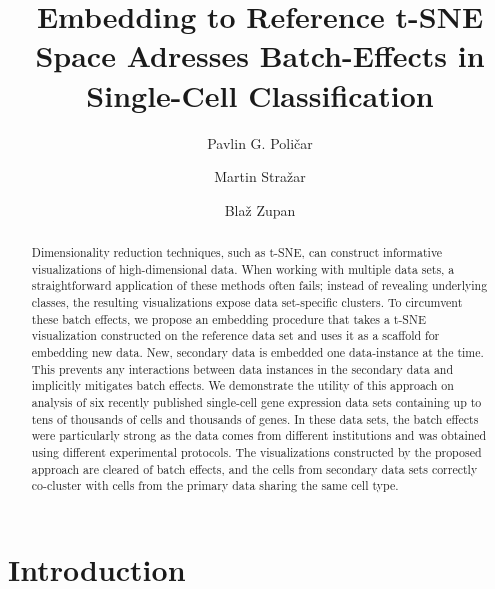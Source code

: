 \documentclass[runningheads]{llncs}
\begin{document}
%
\title{Embedding to Reference t-SNE Space Adresses Batch-Effects in Single-Cell Classification}
%
%
\author{Pavlin G. Poli\v{c}ar \and
Martin Stra\v{z}ar \and
Bla\v{z} Zupan}
%
%

\maketitle

\begin{abstract}

Dimensionality reduction techniques, such as t-SNE, can construct informative
visualizations of high-dimensional data. When working with multiple data sets,
a straightforward application of these methods often fails; instead of
revealing underlying classes, the resulting visualizations expose
data set-specific clusters. To circumvent these batch effects, we propose an
embedding procedure that takes a t-SNE visualization constructed on the reference
data set and uses it as a scaffold for embedding new data. New, secondary data is
embedded one data-instance at the time. This prevents any interactions
between data instances in the secondary data and implicitly mitigates batch
effects. We demonstrate the utility of this approach on analysis of six
recently published single-cell gene expression data sets containing up to tens
of thousands of cells and thousands of genes. In these data sets, the batch
effects were particularly strong as the data comes from different institutions
and was obtained using different experimental protocols. The visualizations
constructed by the proposed approach are cleared of batch effects, and the cells
from secondary data sets correctly co-cluster with cells from the primary data
sharing the same cell type.

\end{abstract}


\section{Introduction}
\end{document}
